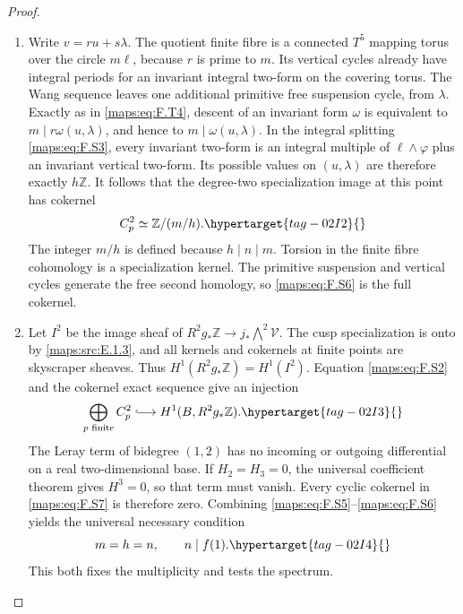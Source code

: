 \documentclass[11pt,a4paper]{article}
\numberwithin{equation}{section}
\theoremstyle{definition}
\begin{document}
\begin{proof}
\begin{enumerate}[label=\arabic*.]
\item Write $v=ru+s\lambda$.  The quotient finite fibre is a
connected $T^5$ mapping torus over the circle $m\ell$,
because $r$ is prime to $m$.
Its vertical cycles already have integral periods for an
invariant integral two-form on the covering torus.
The Wang sequence leaves one additional primitive free
suspension cycle, from $\lambda$.
Exactly as in \eqref{maps:eq:F.T4}, descent of an invariant form $\omega$
is equivalent to
$m\mid r\omega(u,\lambda)$, and hence to
$m\mid\omega(u,\lambda)$.
In the integral splitting \eqref{maps:eq:F.S3}, every invariant two-form
is an integral multiple of $\ell\wedge\varphi$ plus an
invariant vertical two-form.  Its possible values on
$(u,\lambda)$ are therefore exactly $h\mathbb Z$.
It follows that the degree-two specialization image at
this point has cokernel
\begin{equation}
 C^2_p\simeq\mathbb Z/(m/h).
 \hypertarget{tag-02I2}{}\label{maps:eq:F.S6}
\end{equation}
The integer $m/h$ is defined because $h\mid n\mid m$.
Torsion in the finite fibre cohomology is a specialization
kernel.
The primitive suspension and vertical cycles generate the
free second homology, so \eqref{maps:eq:F.S6} is the full cokernel.

\item Let $I^2$ be the image sheaf of
$R^2g_*\mathbb Z\to j_*\bigwedge^2\mathcal V$.
The cusp specialization is onto by \cref{maps:src:E.1.3}, and all kernels
and cokernels at finite points are skyscraper sheaves.
Thus $H^1(R^2g_*\mathbb Z)=H^1(I^2)$.
Equation \eqref{maps:eq:F.S2} and the cokernel exact sequence give an
injection
\begin{equation}
 \bigoplus_{p\text{ finite}}C^2_p
           \lhook\joinrel\longrightarrow H^1(B,R^2g_*\mathbb Z).
 \hypertarget{tag-02I3}{}\label{maps:eq:F.S7}
\end{equation}
The Leray term of bidegree $(1,2)$ has no incoming or
outgoing differential on a real two-dimensional base.
If $H_2=H_3=0$, the universal coefficient theorem gives
$H^3=0$, so that term must vanish.
Every cyclic cokernel in \eqref{maps:eq:F.S7} is therefore zero.
Combining \eqref{maps:eq:F.S5}--\eqref{maps:eq:F.S6} yields the universal necessary
condition
\begin{equation}
 m=h=n,\qquad n\mid f(1).
 \hypertarget{tag-02I4}{}\label{maps:eq:F.S8}
\end{equation}
This both fixes the multiplicity and tests the spectrum.


\end{enumerate}
\end{proof}
\end{document}
